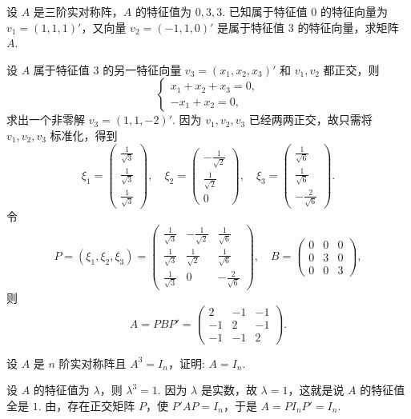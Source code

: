 \documentclass[../../main.tex]{subfiles}%
\begin{document}
\begin{example}
设 $A$ 是三阶实对称阵，$A$ 的特征值为 $0,3,3$. 已知属于特征值 $0$ 的特征向量为 $v_1 = (1,1,1)'$，又向量 $v_2 = (-1,1,0)'$ 是属于特征值 $3$ 的特征向量，求矩阵 $A$.
\end{example}
\begin{solution}

设 $A$ 属于特征值 $3$ 的另一特征向量 $v_3 = (x_1,x_2,x_3)'$ 和 $v_1,v_2$ 都正交，则
\[
\begin{cases}
x_1 + x_2 + x_3 = 0, \\
-x_1 + x_2 = 0,
\end{cases}
\]
求出一个非零解 $v_3 = (1,1,-2)'$. 因为 $v_1,v_2,v_3$ 已经两两正交，故只需将 $v_1,v_2,v_3$ 标准化，得到
\[
\xi_1 = 
\begin{pmatrix}
\frac{1}{\sqrt{3}} \\
\frac{1}{\sqrt{3}} \\
\frac{1}{\sqrt{3}}
\end{pmatrix}, \quad 
\xi_2 = 
\begin{pmatrix}
-\frac{1}{\sqrt{2}} \\
\frac{1}{\sqrt{2}} \\
0
\end{pmatrix}, \quad 
\xi_3 = 
\begin{pmatrix}
\frac{1}{\sqrt{6}} \\
\frac{1}{\sqrt{6}} \\
-\frac{2}{\sqrt{6}}
\end{pmatrix}.
\]
令
\[
P = (\xi_1,\xi_2,\xi_3) = 
\begin{pmatrix}
\frac{1}{\sqrt{3}} & -\frac{1}{\sqrt{2}} & \frac{1}{\sqrt{6}} \\
\frac{1}{\sqrt{3}} & \frac{1}{\sqrt{2}} & \frac{1}{\sqrt{6}} \\
\frac{1}{\sqrt{3}} & 0 & -\frac{2}{\sqrt{6}}
\end{pmatrix}, \quad 
B = 
\begin{pmatrix}
0 & 0 & 0 \\
0 & 3 & 0 \\
0 & 0 & 3
\end{pmatrix},
\]
则
\[
A = PBP' = 
\begin{pmatrix}
2 & -1 & -1 \\
-1 & 2 & -1 \\
-1 & -1 & 2
\end{pmatrix}.
\]

\end{solution}

\begin{example}
设 $A$ 是 $n$ 阶实对称阵且 $A^3 = I_n$，证明: $A = I_n$.
\end{example}
\begin{solution}

设 $A$ 的特征值为 $\lambda$，则 $\lambda^3 = 1$. 因为 $\lambda$ 是实数，故 $\lambda = 1$，这就是说 $A$ 的特征值全是 $1$. 由，存在正交矩阵 $P$，使 $P'AP = I_n$，于是 $A = PI_nP' = I_n$.

\end{solution}
\end{document}
